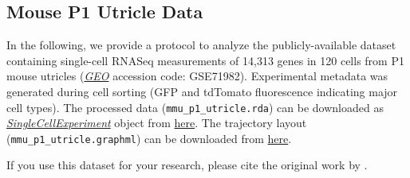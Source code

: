 \documentclass[]{book}
\theoremstyle{definition}
\theoremstyle{definition}
\theoremstyle{definition}
\theoremstyle{remark}
\begin{document}
\subsection{Mouse P1 Utricle Data}\label{mouse-p1-utricle-data}

In the following, we provide a protocol to analyze the
publicly-available dataset containing single-cell RNASeq measurements of
14,313 genes in 120 cells from P1 mouse utricles
(\href{https://www.ncbi.nlm.nih.gov/geo/}{\emph{GEO}} accession code:
GSE71982). Experimental metadata was generated during cell sorting (GFP
and tdTomato fluorescence indicating major cell types). The processed
data (\texttt{mmu\_p1\_utricle.rda}) can be downloaded as
\emph{\href{http://bioconductor.org/packages/SingleCellExperiment}{SingleCellExperiment}}
object from
\href{https://github.com/elldc/CellTrails/raw/master/docs/mmu_p1_utricle.rds}{here}.
The trajectory layout (\texttt{mmu\_p1\_utricle.graphml}) can be
downloaded from
\href{https://github.com/elldc/CellTrails/raw/master/docs/mmu_p1_utricle.graphml}{here}.

If you use this dataset for your research, please cite the original work
by \citet{burns2015}.
\end{document}
